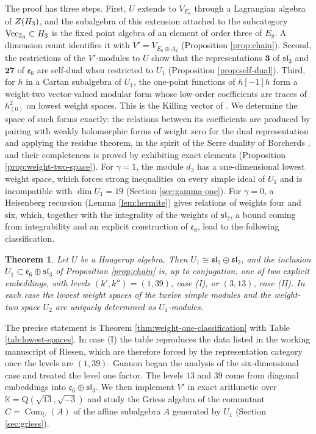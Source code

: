 \documentclass[leqno]{article}
\newcommand{\K}{\ensuremath{\mathbb{K}}}
\newcommand{\Q}{\mathrm{Q}}
\let\cal\relax
\newcommand{\cal}{\mathcal}
\newcommand{\Z}{\ensuremath{\mathbb{Z}}}
\newtheorem{thm}{Theorem}[section]
\numberwithin{equation}{section}
\begin{document}
The proof has three steps. First, $U$ extends to $V_{E_8}$ through a Lagrangian algebra of $Z(\cal H_3)$, and the subalgebra of this extension attached to the subcategory $\mathrm{Vec}_{\Z_3} \subset \cal H_3$ is the fixed point algebra of an element of order three of $E_8$. A dimension count identifies it with $V' = V_{E_6 \oplus A_2}$ (Proposition \ref{prop:chain}). Second, the restrictions of the $V'$-modules to $U$ show that the representations $\mathbf 3$ of $\mathfrak{sl}_3$ and $\mathbf{27}$ of $\mathfrak e_6$ are self-dual when restricted to $U_1$ (Proposition \ref{prop:self-dual}). Third, for $h$ in a Cartan subalgebra of $U_1$, the one-point functions of $h[-1]h$ form a weight-two vector-valued modular form whose low-order coefficients are traces of $h_{(0)}^2$ on lowest weight spaces. This is the Killing vector of \cite[Section 2.4]{Gan19}. We determine the space of such forms exactly: the relations between its coefficients are produced by pairing with weakly holomorphic forms of weight zero for the dual representation and applying the residue theorem, in the spirit of the Serre duality of Borcherds \cite[Theorem 3.1]{Bor99}, and their completeness is proved by exhibiting exact elements (Proposition \ref{prop:weight-two-space}). For $\gamma = 1$, the module $d_3$ has a one-dimensional lowest weight space, which forces strong inequalities on every simple ideal of $U_1$ and is incompatible with $\dim U_1 = 19$ (Section \ref{sec:gamma-one}). For $\gamma = 0$, a Heisenberg recursion (Lemma \ref{lem:hermite}) gives relations of weights four and six, which, together with the integrality of the weights of $\mathfrak{sl}_2$, a bound coming from integrability and an explicit construction of $\mathfrak e_8$, lead to the following classification.

\begin{thm}
\label{thm:intro-lie}
Let $U$ be a Haagerup algebra. Then $U_1 \cong \mathfrak{sl}_2 \oplus \mathfrak{sl}_2$, and the inclusion $U_1 \subset \mathfrak e_6 \oplus \mathfrak{sl}_3$ of Proposition \ref{prop:chain} is, up to conjugation, one of two explicit embeddings, with levels $(k',k'') = (1,39)$, case (I), or $(3,13)$, case (II). In each case the lowest weight spaces of the twelve simple modules and the weight-two space $U_2$ are uniquely determined as $U_1$-modules.
\end{thm}

The precise statement is Theorem \ref{thm:weight-one-classification} with Table \ref{tab:lowest-spaces}. In case (I) the table reproduces the data listed in the working manuscript \cite{Rie26b} of Riesen, which are therefore forced by the representation category once the levels are $(1,39)$. Gannon \cite[Section 3.3]{Gan19} began the analysis of the six-dimensional case and treated the level one factor. The levels $13$ and $39$ come from diagonal embeddings into $\mathfrak e_6 \oplus \mathfrak{sl}_3$. We then implement $V'$ in exact arithmetic over $\K = \Q(\sqrt{13},\sqrt{-3})$ and study the Griess algebra of the commutant $C = \operatorname{Com}_U(A)$ of the affine subalgebra $A$ generated by $U_1$ (Section \ref{sec:griess}).
\end{document}
